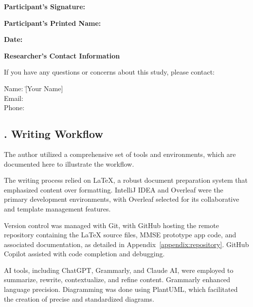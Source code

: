 {\vspace{0.2cm}
\noindent
\textbf{Participant's Signature:} \underline{\hspace{8cm}}

\noindent
\textbf{Participant's Printed Name:} \underline{\hspace{8cm}}

\noindent
\textbf{Date:} \underline{\hspace{8cm}}

\vspace{0.2cm}
\noindent
\textbf{Researcher's Contact Information}

\noindent
If you have any questions or concerns about this study, please contact:

\begin{tabbing}
\hspace{2cm} \= Name: \hspace{0.5cm} \= [Your Name] \\
\> Email:  \\
\> Phone: 
\end{tabbing}
} %


\newpage
{}

\subsection*{. Writing Workflow} \label{appendix:writing-workflow}


The author utilized a comprehensive set of tools and environments, which are documented here to illustrate the workflow.

The writing process relied on \LaTeX{}, a robust document preparation system that emphasized content over formatting. IntelliJ IDEA and Overleaf were the primary development environments, with Overleaf selected for its collaborative and template management features.

Version control was managed with Git, with GitHub hosting the remote repository containing the \LaTeX{} source files, MMSE prototype app code, and associated documentation, as detailed in Appendix~\ref{appendix:repository}. GitHub Copilot assisted with code completion and debugging.

AI tools, including ChatGPT, Grammarly, and Claude AI, were employed to summarize, rewrite, contextualize, and refine content. Grammarly enhanced language precision. Diagramming was done using PlantUML, which facilitated the creation of precise and standardized diagrams.
